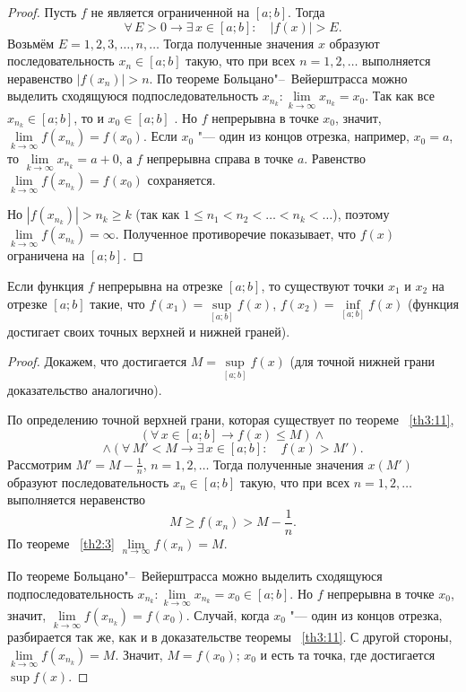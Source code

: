 \begin{proof}
Пусть $f$ не является ограниченной на $[a; b]$. Тогда
$$
\forall\, E > 0 \to \exists\, x \in [a; b] \colon \quad |f(x)| > E.
$$
Возьмём $E = 1, 2, 3, \ldots, n, \ldots$ Тогда полученные значения $x$ образуют последовательность $x_n \in [a; b]$ такую, что при всех $n = 1, 2, \ldots$ выполняется неравенство $|f(x_n)| > n$. По теореме Больцано"--~Вейерштрасса можно выделить сходящуюся подпоследовательность $x_{n_k} \colon \lim\limits_{k \to \infty} x_{n_k} = x_0$. Так как все $x_{n_k} \in [a; b]$, то и $x_0 \in [a; b]$ . Но $f$ непрерывна в точке $x_0$, значит, $\lim\limits_{k \to \infty} f(x_{n_k}) = f(x_0)$. Если $x_0$ "--- один из концов отрезка, например, $x_0 = a$, то $\lim\limits_{k \to \infty} x_{n_k} = a + 0$, а $f$ непрерывна справа в точке $a$. Равенство $\lim\limits_{k \to \infty} f(x_{n_k}) = f(x_0)$ сохраняется.

Но $|f(x_{n_k})| > n_k \ge k$ (так как $1 \le n_1 < n_2 < \ldots < n_k < \ldots$), поэтому $\lim\limits_{k \to \infty} f(x_{n_k}) = \infty$. Полученное противоречие показывает, что $f(x)$ ограничена на $[a; b]$.
\end{proof}


\begin{thm} \label{th3:12}
Если функция $f$ непрерывна на отрезке $[a; b]$, то существуют точки $x_1$ и $x_2$ на отрезке $[a; b]$ такие, что $f(x_1) = \sup\limits_{[a; b]} f(x)$, $f(x_2) = \inf\limits_{[a; b]} f(x)$ (функция достигает своих точных верхней и нижней граней).
\end{thm}

\begin{proof}
Докажем, что достигается $M = \sup\limits_{[a; b]} f(x)$ (для точной нижней грани доказательство аналогично).

По определению точной верхней грани, которая существует по теореме ~\ref{th3:11},
$$
(\forall\, x \in [a; b] \to f(x) \le M) \wedge
$$
$$
\wedge (\forall\, M' < M \to \exists\, x \in [a; b] \colon \quad f(x) > M').
$$
Рассмотрим $M' = M - \frac{1}{n}$, $n = 1, 2, \ldots$ Тогда полученные значения $x(M')$ образуют последовательность $x_n \in [a; b]$ такую, что при всех $n = 1, 2, \ldots$ выполняется неравенство
$$
M \ge f(x_n) > M - \frac{1}{n}.
$$
По теореме ~\ref{th2:3} $\lim\limits_{n \to \infty} f(x_n) = M$.

По теореме Больцано"--~Вейерштрасса можно выделить сходящуюся подпоследовательность $x_{n_k} \colon \lim\limits_{k \to \infty} x_{n_k} = x_0 \in [a; b]$. Но $f$ непрерывна в точке $x_0$, значит, $\lim\limits_{k \to \infty} f(x_{n_k}) = f(x_0)$. Случай, когда $x_0$ "--- один из концов отрезка, разбирается так же, как и в доказательстве теоремы ~\ref{th3:11}. С другой стороны, $\lim\limits_{k \to \infty} f(x_{n_k}) = M$. Значит, $M = f(x_0)$; $x_0$ и есть та точка, где достигается $\sup f(x)$.
\end{proof}

